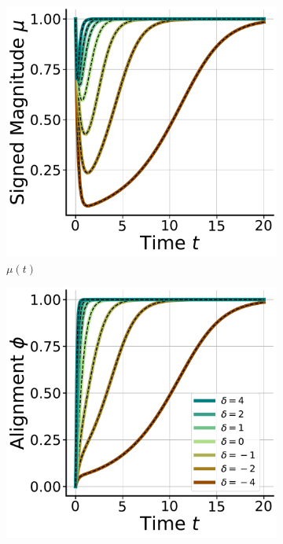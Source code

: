 \documentclass{article}
\theoremstyle{plain}
\theoremstyle{definition}
\theoremstyle{remark}
\begin{document}
\begin{figure}
    \vspace{-14pt}
    \begin{subfigure}{0.325\linewidth}
        \centering
        \includegraphics[width=\linewidth]{fig/single-neuron/mu.pdf}
        \caption{$\mu(t)$}
    \end{subfigure}
    \begin{subfigure}{0.325\linewidth}
        \centering
        \includegraphics[width=\linewidth]{fig/single-neuron/phi.pdf}

\end{subfigure}
\end{figure}
\end{document}
